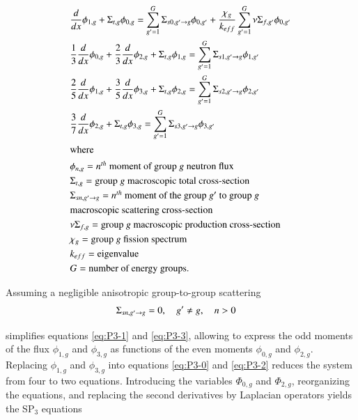 \documentclass{anstrans}
\begin{document}
\begin{align}
    & \frac{d}{dx} \phi_{1,g} + \Sigma_{t,g} \phi_{0,g} = \sum_{g'=1}^G \Sigma_{s0,g' \rightarrow g} \phi_{0,g'} + \frac{\chi_g}{k_{eff}} \sum_{g'=1}^G \nu\Sigma_{f,g'} \phi_{0,g'} \label{eq:P3-0} \\
    & \frac{1}{3} \frac{d}{dx} \phi_{0,g} + \frac{2}{3}\frac{d}{dx}\phi_{2,g} + \Sigma_{t,g} \phi_{1,g} = \sum_{g'=1}^G \Sigma_{s1,g' \rightarrow g} \phi_{1,g'} \label{eq:P3-1} \\
    & \frac{2}{5} \frac{d}{dx}\phi_{1,g} + \frac{3}{5}\frac{d}{dx}\phi_{3,g} + \Sigma_{t,g} \phi_{2,g} = \sum_{g'=1}^G \Sigma_{s2,g' \rightarrow g} \phi_{2,g'} \label{eq:P3-2} \\
    & \frac{3}{7}\frac{d}{dx}\phi_{2,g} + \Sigma_{t,g} \phi_{3,g} = \sum_{g'=1}^G \Sigma_{s3,g' \rightarrow g} \phi_{3,g'} \label{eq:P3-3} \\
    \intertext{where}
    & \phi_{n,g} = \mbox{$n^{th}$ moment of group $g$ neutron flux}  \notag \\ %
    & \Sigma_{t,g} = \mbox{group $g$ macroscopic total cross-section}  \notag \\ %
	& \Sigma_{sn,g' \rightarrow g} = \mbox{$n^{th}$ moment of the group $g'$ to group $g$} \notag \\
	& \mbox{macroscopic scattering cross-section}  \notag \\ %
	& \nu\Sigma_{f,g} = \mbox{group $g$ macroscopic production cross-section}  \notag \\ %
	& \chi_{g} = \mbox{group $g$ fission spectrum}  \notag \\ %
	& k_{eff} = \mbox{eigenvalue}  \notag \\ %
	& G = \mbox{number of energy groups}.  \notag %
\end{align}

Assuming a negligible anisotropic group-to-group scattering \cite{brantley_simplifiedP3_2000}
\begin{align}
	& \Sigma_{sn,g' \rightarrow g} = 0, \quad g' \ne g, \quad n > 0 \notag
\end{align}

\noindent
simplifies equations \ref{eq:P3-1} and \ref{eq:P3-3}, allowing to express the odd moments of the flux $\phi_{1,g}$ and $\phi_{3,g}$ as functions of the even moments $\phi_{0,g}$ and $\phi_{2,g}$.
Replacing $\phi_{1,g}$ and $\phi_{3,g}$ into equations \ref{eq:P3-0} and \ref{eq:P3-2} reduces the system from four to two equations.
Introducing the variables $\Phi_{0,g}$ and $\Phi_{2,g}$, reorganizing the equations, and replacing the second derivatives by Laplacian operators \cite{gelbard_spherical_1960} yields the SP$_3$ equations \cite{beckert_development_2007}
\end{document}
